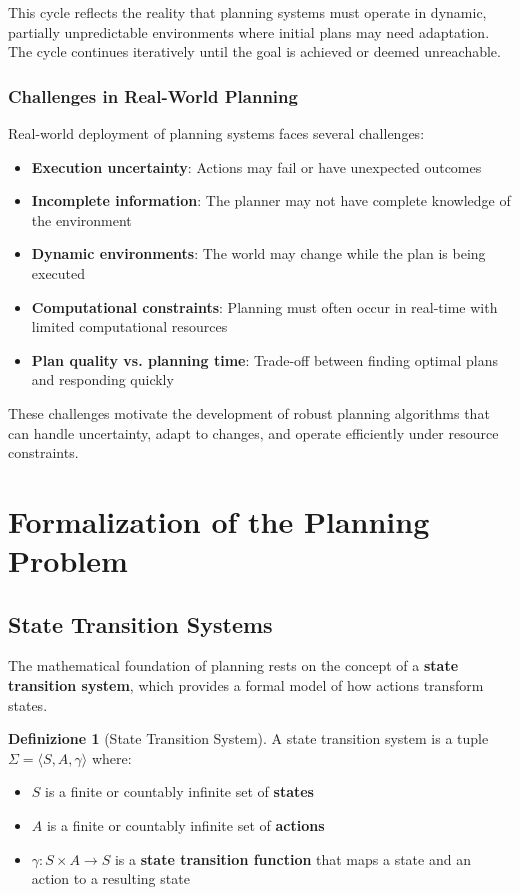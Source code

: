 \documentclass[11pt,a4paper]{article}
\theoremstyle{definition}
\newtheorem{definition}{Definizione}[section]
\theoremstyle{plain}
\theoremstyle{remark}
\begin{document}
This cycle reflects the reality that planning systems must operate in dynamic, partially unpredictable environments where initial plans may need adaptation. The cycle continues iteratively until the goal is achieved or deemed unreachable.

\subsubsection{Challenges in Real-World Planning}

Real-world deployment of planning systems faces several challenges:

\begin{itemize}
    \item \textbf{Execution uncertainty}: Actions may fail or have unexpected outcomes
    \item \textbf{Incomplete information}: The planner may not have complete knowledge of the environment
    \item \textbf{Dynamic environments}: The world may change while the plan is being executed
    \item \textbf{Computational constraints}: Planning must often occur in real-time with limited computational resources
    \item \textbf{Plan quality vs. planning time}: Trade-off between finding optimal plans and responding quickly
\end{itemize}

These challenges motivate the development of robust planning algorithms that can handle uncertainty, adapt to changes, and operate efficiently under resource constraints.

\newpage

\section{Formalization of the Planning Problem}

\subsection{State Transition Systems}

The mathematical foundation of planning rests on the concept of a \textbf{state transition system}, which provides a formal model of how actions transform states.

\begin{definition}[State Transition System]
A state transition system is a tuple $\Sigma = \langle S, A, \gamma \rangle$ where:
\begin{itemize}
    \item $S$ is a finite or countably infinite set of \textbf{states}
    \item $A$ is a finite or countably infinite set of \textbf{actions}
    \item $\gamma : S \times A \rightarrow S$ is a \textbf{state transition function} that maps a state and an action to a resulting state
\end{itemize}
\end{definition}
\end{document}
